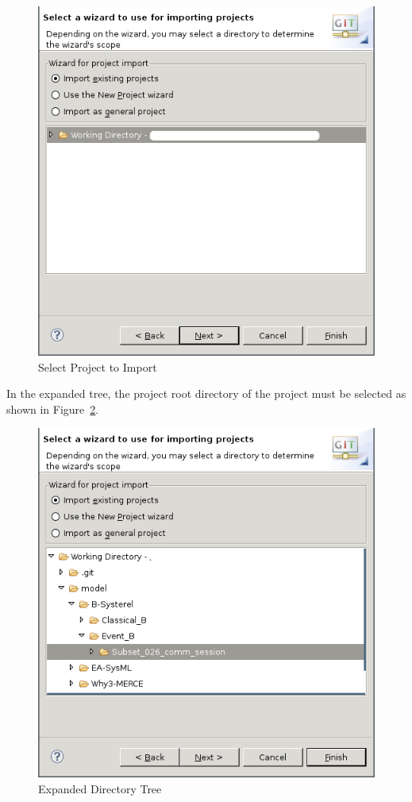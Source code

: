 \documentclass{template/openetcs_article}
\begin{document}
\begin{figure}[H]
  \centering
  \includegraphics[width=\skalierung\textwidth]{project_import_step6}
  \caption{Select Project to Import}
  \label{fig:select-project-import}
\end{figure}

In the expanded tree, the project root directory of the project must be selected
as shown in Figure~\ref{fig:expanded-tree}.

\begin{figure}[H]
  \centering
  \includegraphics[width=\skalierung\textwidth]{project_import_step7}
  \caption{Expanded Directory Tree}
  \label{fig:expanded-tree}
\end{figure}
\end{document}
